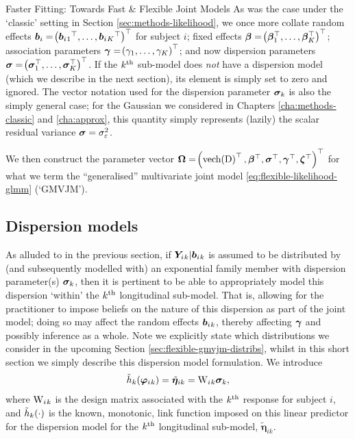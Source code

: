 \begin{chapter}{\label{cha:flexible}Faster Fitting: Towards Fast \& Flexible Joint Models}
As was the case under the `classic' setting in Section \ref{sec:methods-likelihood}, we once more collate random effects $\bm{b}_i=\!\left(\bm{b}_i{_1}^\top,\dots,\bm{b}_i{_K}^\top\right)^\top$ for subject $i$; fixed effects $\bm{\beta}=\!\left(\bm{\beta}_1^\top,\dots,\bm{\beta}_K^\top\right)^\top$; association parameters $\bm{\gamma}=\!\left(\gamma_1,\dots,\gamma_K\right)^\top$; and now dispersion parameters $\bm{\sigma}=\!\left(\bm{\sigma}_1^\top,\dots,\bm{\sigma}_K^\top\right)^\top$. If the $k^{\text{th}}$ sub-model does \textit{not} have a dispersion model (which we describe in the next section), its element is simply set to zero and ignored. The vector notation used for the dispersion parameter $\bm{\sigma}_k$ is also the simply general case; for \eg the Gaussian we considered in Chapters \ref{cha:methods-classic} and \ref{cha:approx}, this quantity simply represents (lazily) the scalar residual variance $\bm{\sigma}=\sigma_\varepsilon^2$.

We then construct the parameter vector $\bm{\mathrm{\Omega}}=\!\left(\text{vech}\!\left(\mathrm{D}\right)^\top,\bm{\beta}^\top,\bm{\sigma}^\top,\bm{\gamma}^\top,\bm{\zeta}^\top\right)^\top$ for what we term the ``generalised'' multivariate joint model \eqref{eq:flexible-likelihood-glmm} (`GMVJM').

\subsection{Dispersion models}\label{sec:flexible-gmvjm-disp}
As alluded to in the previous section, if $\bm{Y}_i{_k}|\bm{b}_i{_k}$ is assumed to be distributed by (and subsequently modelled with) an exponential family member with dispersion parameter(s) $\bm{\sigma}_k$, then it is pertinent to be able to appropriately model this dispersion `within' the $k^{\text{th}}$ longitudinal sub-model. That is, allowing for the practitioner to impose beliefs on the nature of this dispersion as part of the joint model; doing so may affect the random effects $\bm{b}_i{_k}$, thereby affecting $\bm{\gamma}$ and possibly inference as a whole. Note we explicitly state which distributions we consider in the upcoming Section \ref{sec:flexible-gmvjm-distribs}, whilst in this short section we simply describe this dispersion model formulation. We introduce
\begin{align}
    \tilde{h}_k\!\left(\bm{\varphi}_i{_k}\right)=\tilde{\bm{\eta}}_{ik}=\mathrm{W}_i{_k}\bm{\sigma}_k,
\label{eq:flexible-dispmodel}
\end{align}
where $\mathrm{W}_i{_k}$ is the design matrix associated with the $k^{\text{th}}$ response for subject $i$, and $\tilde{h}_k\!\left(\cdot\right)$ is the known, monotonic, link function imposed on this linear predictor for the dispersion model for the $k^{\text{th}}$ longitudinal sub-model, $\tilde{\bm{\eta}}_{ik}$.


\end{chapter}
